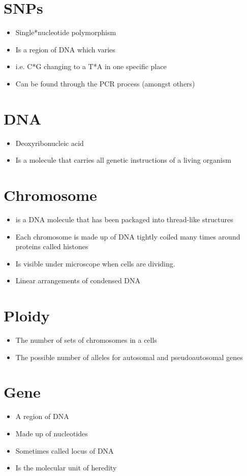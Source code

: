 \documentclass[a4paper]{article}
\begin{document}
\section{SNPs}
\label{sec-5}
\begin{itemize}
\item Single*nucleotide polymorphism
\item Is a region of DNA which varies
\item i.e. C*G changing to a T*A in one specific place
\item Can be found through the PCR process (amongst others)
\end{itemize}

\section{DNA}
\label{sec-6}
\begin{itemize}
\item Deoxyribonucleic acid
\item Is a molecule that carries all genetic instructions of a living organism
\end{itemize}

\section{Chromosome}
\label{sec-7}
\begin{itemize}
\item is a DNA molecule that has been packaged into thread-like structures
\item Each chromosome is made up of DNA tightly coiled many times around proteins called histones
\item Is visible under microscope when cells are dividing.
\item Linear arrangements of condensed DNA
\end{itemize}

\section{Ploidy}
\label{sec-8}
\begin{itemize}
\item The number of sets of chromosomes in a cells
\item The possible number of alleles for autosomal and pseudoautosomal genes
\end{itemize}

\section{Gene}
\label{sec-9}
\begin{itemize}
\item A region of DNA
\item Made up of nucleotides
\item Sometimes called locus of DNA
\item Is the molecular unit of heredity
\end{itemize}
\end{document}
